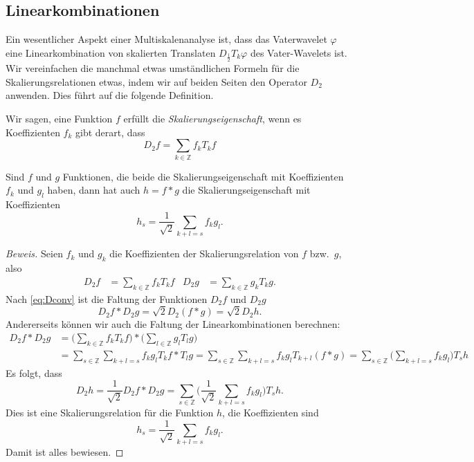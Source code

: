 \subsection{Linearkombinationen
\label{subsection:linearkombinationen}}
Ein wesentlicher Aspekt einer Multiskalenanalyse ist, dass das
Vaterwavelet $\varphi$ eine Linearkombination von skalierten
Translaten $D_{\frac12}T_k\varphi$ des Vater-Wavelets ist.
Wir vereinfachen die manchmal etwas umständlichen Formeln für
die Skalierungsrelationen etwas, indem wir auf beiden Seiten
den Operator $D_2$ anwenden.
Dies führt auf die folgende Definition.

\begin{definition}
Wir sagen, eine Funktion $f$ erfüllt die {\em Skalierungseigenschaft},
wenn es Koeffizienten $f_k$ gibt derart, dass
\[
D_2f = \sum_{k\in\mathbb Z} f_k T_kf
\]
\end{definition}

\begin{satz}
\label{satz:faltung-linearkombination}
Sind $f$ und $g$ Funktionen, die beide die Skalierungseigenschaft
mit Koeffizienten $f_k$ und $g_l$
haben, dann hat auch $h=f*g$ die Skalierungseigenschaft
mit Koeffizienten
\begin{equation}
h_s = \frac1{\sqrt{2}} \sum_{k+l=s}f_kg_l.
\label{eq:faltung-linearkombination}
\end{equation}
\end{satz}

\begin{proof}[Beweis]
Seien $f_k$ und $g_k$ die Koeffizienten der Skalierungsrelation von $f$
bzw.~$g$, also
\begin{align*}
D_2f
&=
\sum_{k\in\mathbb Z} f_k T_kf
&
D_2g
&=
\sum_{k\in\mathbb Z} g_k T_kg.
\end{align*}
Nach \eqref{eq:Dconv} ist die Faltung der Funktionen $D_2f$ und $D_2g$
\[
D_2f * D_2g
=
\sqrt{2}
D_2(f*g)
=
\sqrt{2}
D_2h.
\]
Andererseits können wir auch die Faltung der Linearkombinationen 
berechnen:
\begin{align*}
D_2f * D_2g
&=
\biggl( \sum_{k\in\mathbb Z} f_kT_kf \biggr)
*
\biggl( \sum_{l\in\mathbb Z} g_lT_lg \biggr)
\\
&=
\sum_{s\in\mathbb Z}
\sum_{k+l=s} f_kg_l T_kf * T_lg
=
\sum_{s\in\mathbb Z}
\sum_{k+l=s} f_kg_l T_{k+l}(f * g)
=
\sum_{s\in\mathbb Z}
\biggl(\sum_{k+l=s} f_kg_l\biggr) T_sh
\end{align*}
Es folgt, dass
\[
D_2h
=
\frac1{\sqrt{2}} D_2f * D_2g
=
\sum_{s\in\mathbb Z}
\biggl(\frac1{\sqrt{2}}\sum_{k+l=s} f_kg_l\biggr) T_sh.
\]
Dies ist eine Skalierungsrelation für die Funktion $h$, die Koeffizienten
sind
\[
h_s = \frac1{\sqrt{2}} \sum_{k+l=s}f_kg_l.
\]
Damit ist alles bewiesen.
\end{proof}

